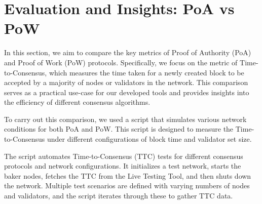\section{Evaluation and Insights: PoA vs PoW}

In this section, we aim to compare the key metrics of Proof of Authority (PoA) and Proof of Work (PoW) protocols. Specifically, we focus on the metric of Time-to-Consensus, which measures the time taken for a newly created block to be accepted by a majority of nodes or validators in the network. This comparison serves as a practical use-case for our developed tools and provides insights into the efficiency of different consensus algorithms.

To carry out this comparison, we used a script that simulates various network conditions for both PoA and PoW. This script is designed to measure the Time-to-Consensus under different configurations of block time and validator set size.

The script automates Time-to-Consensus (TTC) tests for different consensus protocols and network configurations. It initializes a test network, starts the baker nodes, fetches the TTC from the Live Testing Tool, and then shuts down the network. Multiple test scenarios are defined with varying numbers of nodes and validators, and the script iterates through these to gather TTC data.

